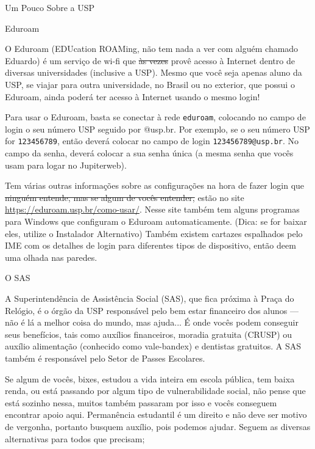 \begin{secao}{Um Pouco Sobre a USP}
\begin{subsecao}{Eduroam}

O Eduroam (EDUcation ROAMing, não tem nada a ver com alguém chamado Eduardo) é um
serviço de wi-fi que \sout{às vezes} provê acesso à Internet dentro de diversas
universidades (inclusive a USP). Mesmo que você seja apenas aluno da USP, se viajar
para outra universidade, no Brasil ou no exterior, que possui o Eduroam, ainda poderá
ter acesso à Internet usando o mesmo login!

Para usar o Eduroam, basta se conectar à rede \texttt{eduroam}, colocando no campo
de login o seu número USP seguido por @usp.br. Por exemplo, se o seu número USP for
\texttt{123456789}, então deverá colocar no campo de login \texttt{123456789@usp.br}.
No campo da senha, deverá colocar a sua senha única (a mesma senha que vocês usam
para logar no Jupiterweb).

Tem várias outras informações sobre as configurações na hora de fazer login que
\sout{ninguém entende, mas se algum de vocês entender,} estão no site
\url{https://eduroam.usp.br/como-usar/}. Nesse site também tem alguns programas para Windows que 
configuram o Eduroam automaticamente. (Dica: se for baixar eles, utilize o Instalador Alternativo) %
Também existem cartazes espalhados pelo IME com os detalhes de login para diferentes tipos de 
dispositivo, então deem uma olhada nas paredes.

\end{subsecao}

\begin{subsecao}{O SAS}

A Superintendência de Assistência Social (SAS), que fica próxima à Praça do
Relógio, é o órgão da USP responsável pelo bem estar financeiro dos alunos — não
é lá a melhor coisa do mundo, mas ajuda... É onde vocês podem conseguir seus
benefícios, tais como auxílios financeiros, moradia gratuita (CRUSP)
ou auxílio alimentação (conhecido como vale-bandex) e dentistas gratuitos.
A SAS também é responsável pelo Setor de Passes Escolares.

Se algum de vocês, bixes, estudou a vida inteira em escola pública, tem baixa renda,
ou está passando por algum tipo de vulnerabilidade social, não pense que está sozinho nessa,
muitos também passaram por isso e vocês conseguem encontrar apoio aqui. Permanência
estudantil é um direito e não deve ser motivo de vergonha, portanto busquem
auxílio, pois podemos ajudar. Seguem as diversas alternativas para todos 
que precisam;


\end{subsecao}
\end{secao}
